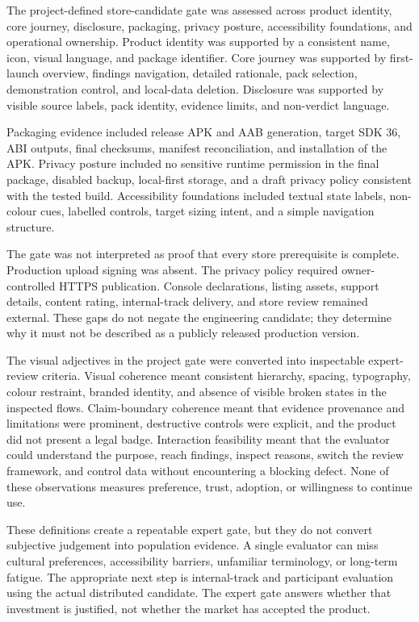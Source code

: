 The project-defined store-candidate gate was assessed across product identity, core journey, disclosure, packaging, privacy posture, accessibility foundations, and operational ownership. Product identity was supported by a consistent name, icon, visual language, and package identifier. Core journey was supported by first-launch overview, findings navigation, detailed rationale, pack selection, demonstration control, and local-data deletion. Disclosure was supported by visible source labels, pack identity, evidence limits, and non-verdict language.

Packaging evidence included release APK and AAB generation, target SDK 36, ABI outputs, final checksums, manifest reconciliation, and installation of the APK. Privacy posture included no sensitive runtime permission in the final package, disabled backup, local-first storage, and a draft privacy policy consistent with the tested build. Accessibility foundations included textual state labels, non-colour cues, labelled controls, target sizing intent, and a simple navigation structure.

The gate was not interpreted as proof that every store prerequisite is complete. Production upload signing was absent. The privacy policy required owner-controlled HTTPS publication. Console declarations, listing assets, support details, content rating, internal-track delivery, and store review remained external. These gaps do not negate the engineering candidate; they determine why it must not be described as a publicly released production version.

The visual adjectives in the project gate were converted into inspectable expert-review criteria. Visual coherence meant consistent hierarchy, spacing, typography, colour restraint, branded identity, and absence of visible broken states in the inspected flows. Claim-boundary coherence meant that evidence provenance and limitations were prominent, destructive controls were explicit, and the product did not present a legal badge. Interaction feasibility meant that the evaluator could understand the purpose, reach findings, inspect reasons, switch the review framework, and control data without encountering a blocking defect. None of these observations measures preference, trust, adoption, or willingness to continue use.

These definitions create a repeatable expert gate, but they do not convert subjective judgement into population evidence. A single evaluator can miss cultural preferences, accessibility barriers, unfamiliar terminology, or long-term fatigue. The appropriate next step is internal-track and participant evaluation using the actual distributed candidate. The expert gate answers whether that investment is justified, not whether the market has accepted the product.

